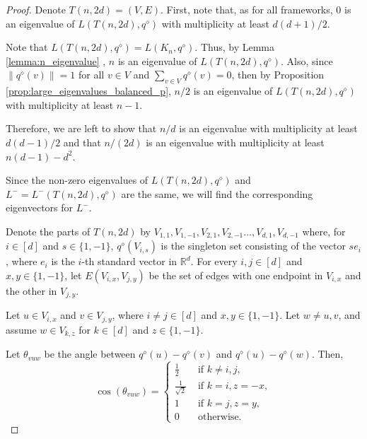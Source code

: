 \documentclass[a4paper,11pt]{article}
\theoremstyle{plain}
\theoremstyle{definition}
\newcommand{\Rea}{{\mathbb R}}
\begin{document}
\crosspolytopespectrum*
\begin{proof}

Denote $T(n,2d)=(V,E)$.
First, note that, as for all frameworks, $0$ is an eigenvalue of $L(T(n,2d),q^{\diamond})$ with multiplicity at least $d(d+1)/2$.


Note that $L(T(n,2d),q^{\diamond})=L(K_n,q^{\diamond})$. Thus, by Lemma \ref{lemma:n_eigenvalue} , $n$ is an eigenvalue of $L(T(n,2d),q^{\diamond})$.
Also, since $\|q^{\diamond}(v)\|=1$ for all $v\in V$ and $\sum_{v\in V} q^{\diamond}(v)=0$, then by Proposition \ref{prop:large_eigenvalues_balanced_p}, $n/2$ is an eigenvalue of $L(T(n,2d),q^{\diamond})$ with multiplicity at least $n-1$.

Therefore, we are left to show that $n/d$ is an eigenvalue with multiplicity at least $d(d-1)/2$ and that $n/(2d)$ is an eigenvalue with multiplicity at least $n(d-1)-d^2$.

Since the non-zero eigenvalues of $L(T(n,2d),q^{\diamond})$ and $L^{-}=L^{-}(T(n,2d),q^{\diamond})$ are the same, we will find the corresponding eigenvectors for $L^{-}$.

Denote the parts of $T(n,2d)$ by $V_{1,1},V_{1,-1},V_{2,1},V_{2,-1}\ldots,V_{d,1},V_{d,-1}$ where, for $i\in[d]$ and $s\in\{1,-1\}$, $q^{\diamond}(V_{i,s})$ is the singleton set consisting of the vector $s e_i$, where $e_i$ is the $i$-th standard vector in $\Rea^d$. 
For every $i,j\in [d]$ and $x,y\in\{1,-1\}$, let $E(V_{i,x},V_{j,y})$ be the set of edges with one endpoint in $V_{i,x}$ and the other in $V_{j,y}$.

Let $u\in V_{i,x}$ and $v\in V_{j,y}$, where $i\neq j\in[d]$ and $x,y\in\{1,-1\}$. Let $w\neq u,v$, and assume $w\in V_{k,z}$ for $k\in [d]$ and $z\in\{1,-1\}$.

Let $\theta_{v u w}$ be the angle between $q^{\diamond}(u)-q^{\diamond}(v)$ and $q^{\diamond}(u)-q^{\diamond}(w)$. Then,
\begin{equation}\label{eq:angles2d}
\cos(\theta_{v u w})=\begin{cases}
    \frac{1}{2} & \text{ if } k\neq i,j,\\
    \frac{1}{\sqrt{2}} & \text{ if } k=i, z=-x,\\
    1 & \text{ if } k=j, z=y,\\
    0 & \text{ otherwise.}
    \end{cases}
\end{equation}



\end{proof}
\end{document}
